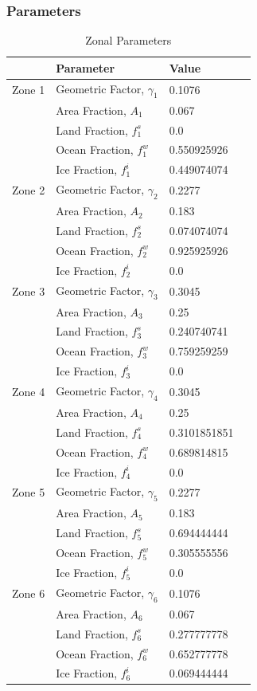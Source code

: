 \documentclass[12pt]{article}
\begin{document}
\subsubsection{Parameters} \label{sec:Parameters}

\begin{table}[H]
    \captionsetup{singlelinecheck = false, justification=justified}
    \caption{Zonal Parameters}
    \begin{tabular}{llll}
    \hline
     & Parameter & Value \\
    \hline
    Zone 1 & Geometric Factor, $\gamma_1$ & 0.1076  \\
     & Area Fraction, $A_1$ & 0.067\\
     & Land Fraction, $f_1^s$ & 0.0 \\
     & Ocean Fraction, $f_1^w$  & 0.550925926 \\ 
     & Ice Fraction, $f_1^i$ & 0.449074074 \\
    \hline
    Zone 2 & Geometric Factor, $\gamma_2$ & 0.2277 \\
     & Area Fraction, $A_2$ & 0.183\\
     & Land Fraction, $f_2^s$ & 0.074074074 \\
     & Ocean Fraction, $f_2^w$ & 0.925925926 \\ 
     & Ice Fraction, $f_2^i$ & 0.0\\
    \hline
    Zone 3 & Geometric Factor, $\gamma_3$ & 0.3045 \\
     & Area Fraction, $A_3$ & 0.25 \\
     & Land Fraction, $f_3^s$ & 0.240740741 \\
     & Ocean Fraction, $f_3^w$ & 0.759259259 \\ 
     & Ice Fraction, $f_3^i$ & 0.0\\
    \hline
    Zone 4 & Geometric Factor, $\gamma_4$ & 0.3045 \\
     & Area Fraction, $A_4$ & 0.25 \\
     & Land Fraction, $f_4^s$ & 0.3101851851 \\
     & Ocean Fraction, $f_4^w$ & 0.689814815 \\ 
     & Ice Fraction, $f_4^i$ & 0.0 \\
    \hline
    Zone 5 & Geometric Factor, $\gamma_5$ & 0.2277 \\
     & Area Fraction, $A_5$ & 0.183 \\
     & Land Fraction, $f_5^s$ & 0.694444444 \\
     & Ocean Fraction, $f_5^w$ & 0.305555556 \\ 
     & Ice Fraction, $f_5^i$ & 0.0 \\
    \hline
    Zone 6 & Geometric Factor, $\gamma_6$ & 0.1076\\
     & Area Fraction, $A_6$ & 0.067 \\
     & Land Fraction, $f_6^s$ & 0.277777778\\
     & Ocean Fraction, $f_6^w$  & 0.652777778\\ 
     & Ice Fraction, $f_6^i$ & 0.069444444\\
    \end{tabular}
    \label{tab:zoneparams}
\end{table}
\FloatBarrier
\end{document}
